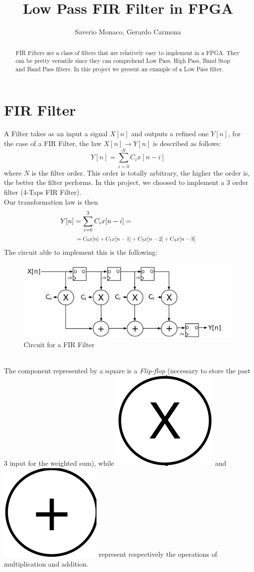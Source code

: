 \documentclass[11pt,a4paper,twocolumn]{IEEEtran}
\author{Saverio Monaco, Gerardo Carmona\\ \sepline}
\title{\textbf{Low Pass FIR Filter in FPGA}}
\newcommand*{\Scale}[2][4]{\scalebox{#1}{$#2$}}
\begin{document}
	\maketitle
	\begin{abstract}
		FIR Filters are a class of filters that are relatively easy to implement in a FPGA. They can be pretty versatile since they can comprehend Low Pass, High Pass, Band Stop and Band Pass filters. In this project we present an example of a Low Pass filter.
	\end{abstract}
	\section{FIR Filter}
	A Filter takes as an input a signal $X[n]$ and outputs a refined one $Y[n]$, for the case of a FIR Filter, the law $X[n]\to Y[n]$ is described as follows: 
	$$ Y[n] = \sum_{i=0}^N C_i x[n-i] $$
	where $N$ is the filter order. This order is totally arbitrary, the higher the order is, the better the filter performs. In this project, we choosed to implement a 3 order filter (4-Taps FIR Filter).\\ Our transformation law is then
	$$\begin{aligned} Y[n]&=\sum_{i=0}^3 C_ix[n-i]=\\ & \Scale[0.8]{\hspace*{.2cm}=C_0x[n]+C_1x[n-1]+C_2x[n-2]+C_3x[n-3]}\end{aligned}$$
	The circuit able to implement this is the following:
	\begin{figure}[h]
		\centering
		\includegraphics[width=1\linewidth]{img/FIR_direct_svg}
		\caption{Circuit for a FIR Filter}
	\end{figure}\\
	The component represented by a square is a \emph{Flip-flop} (necessary to store the past 3 input for the weighted sum), while \includegraphics[width=0.05\linewidth]{img/x} and \includegraphics[width=0.05\linewidth]{img/+} represent respectively the operations of multiplication and addition.\\
\end{document}
